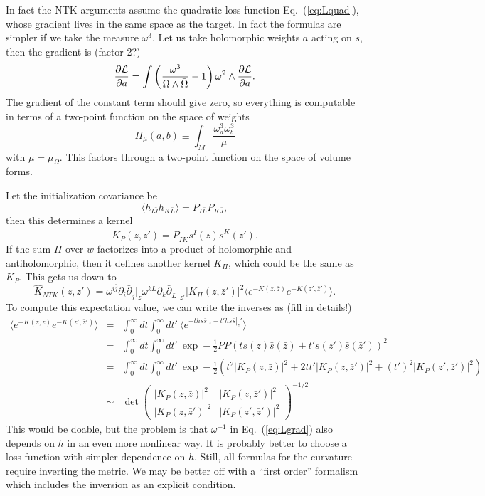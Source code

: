 \documentclass[12pt]{article}
\def\CL {{\cal L}}
\def\vev#1{\bigg\langle #1 \bigg\rangle}
\def\half{\frac{1}{2}}
\newcommand{\eq}[1]{Eq.~(\ref{eq:#1})}
\newcommand{\be}{\begin{equation}}
\newcommand{\ee}{\end{equation}}
\newcommand{\bea}{\begin{eqnarray}}
\newcommand{\eea}{\end{eqnarray}}
\def\bz{\bar{z}}
\def\bj{{\bar{j}}}
\def\bs{{\bar{s}}}
\def\bz{\bar{z}}
\def\bJ{{\bar{J}}}
\def\bK{{\bar{K}}}
\def\bL{{\bar{L}}}
\def\hK{{\hat K}}
\begin{document}
In fact the NTK arguments assume the quadratic loss function \eq{Lquad}, whose
gradient lives in the same space as the target.  In fact the formulas are simpler if we
take the measure $\omega^3$.  Let us take holomorphic weights $a$
acting on $s$, then the gradient is (factor 2?)
\be
\frac{\partial\CL}{\partial a} = \int \left(\frac{\omega^3}{ \Omega \wedge\bar\Omega} - 1\right)
 \omega^2 \wedge \frac{\partial\CL}{\partial a} .
\ee
The gradient of the constant term should give zero, so everything is computable in terms of
a two-point function on the space of weights
\be
\Pi_\mu( a, b ) \equiv \int_M \frac{ \omega^3_a \omega^3_b } { \mu }
\ee
with $\mu=\mu_\Omega$.
This factors through a two-point function on the space of volume forms.

Let the initialization covariance be
\be
\vev{h_{I\bJ} h_{K\bL}} = P_{I\bL} P_{K\bJ} ,
\ee
then this determines a kernel
\be
K_P(z,\bz') = P_{I\bK} s^I(z) \bs^\bK(\bz') .
\ee
If the sum $\Pi$ over $w$ factorizes into a product of holomorphic and antiholomorphic,
then it defines another kernel $K_\Pi$, which could be the same as $K_P$.
This gets us down to
\be
\hK_{NTK}(z,z') = \omega^{i\bj} \partial_i \bar\partial_\bj  \bigg|_z
\omega^{k\bL} \partial_k \bar\partial_\bL \bigg|_{z'} |K_\Pi(z,\bz')|^2 \vev{ e^{-K{(z,\bz)}} e^{-K{(z',\bz')}} }.
\ee
To compute this expectation value, we can write the inverses as (fill in details!)
\bea
 \vev{ e^{-K{(z,\bz)}} e^{-K{(z',\bz')}} } &=& \int_0^\infty dt \int_0^\infty dt' \ \vev{ e^{-ths\bs|_z-t'hs\bs|_z'} } \\
 &=& \int_0^\infty dt \int_0^\infty dt' \ \exp -\half P P\left( t s(z)\bs(\bz) + t' s(z') \bs(\bz') \right)^2 \\
 \nonumber
 &=& \int_0^\infty dt \int_0^\infty dt' \ \exp -\half\left( t^2 |K_P(z,\bz)|^2 + 2tt' |K_P(z,\bz')|^2 + (t')^2|K_P(z',\bz')|^2
 \right) \\
 &\sim& \det\left(\begin{matrix} 
 |K_P(z,\bz)|^2 & |K_P(z,\bz')|^2 \\
 |K_P(z,\bz')|^2 & |K_P(z',\bz')|^2 \end{matrix} \right)^{-1/2}
\eea
This would be doable, but the problem is that $\omega^{-1}$ in \eq{Lgrad} also depends on $h$ in an
even more nonlinear way.  It is probably better to choose a loss function with simpler dependence on $h$.
Still, all formulas for the curvature require inverting the metric.
We may be better off with a ``first order'' formalism which includes the inversion as an explicit condition.
\end{document}
